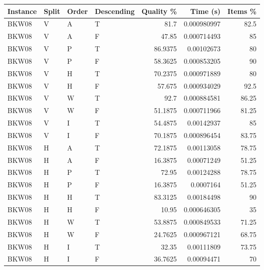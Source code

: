 \begin{tabular}{llllrrr}
    \hline
    Instance & Split & Order & Descending & Quality \% & Time (s)    & Items \% \\
    \hline
    BKW08    & V     & A     & T          & 81.7       & 0.000980997 & 82.5     \\
    BKW08    & V     & A     & F          & 47.85      & 0.000714493 & 85       \\
    BKW08    & V     & P     & T          & 86.9375    & 0.00102673  & 80       \\
    BKW08    & V     & P     & F          & 58.3625    & 0.000853205 & 90       \\
    BKW08    & V     & H     & T          & 70.2375    & 0.000971889 & 80       \\
    BKW08    & V     & H     & F          & 57.675     & 0.000934029 & 92.5     \\
    BKW08    & V     & W     & T          & 92.7       & 0.000884581 & 86.25    \\
    BKW08    & V     & W     & F          & 51.1875    & 0.000711966 & 81.25    \\
    BKW08    & V     & I     & T          & 54.4875    & 0.00142937  & 85       \\
    BKW08    & V     & I     & F          & 70.1875    & 0.000896454 & 83.75    \\
    BKW08    & H     & A     & T          & 72.1875    & 0.00113058  & 78.75    \\
    BKW08    & H     & A     & F          & 16.3875    & 0.00071249  & 51.25    \\
    BKW08    & H     & P     & T          & 72.95      & 0.00124288  & 78.75    \\
    BKW08    & H     & P     & F          & 16.3875    & 0.0007164   & 51.25    \\
    BKW08    & H     & H     & T          & 83.3125    & 0.00184498  & 90       \\
    BKW08    & H     & H     & F          & 10.95      & 0.000646305 & 35       \\
    BKW08    & H     & W     & T          & 53.8875    & 0.000849533 & 71.25    \\
    BKW08    & H     & W     & F          & 24.7625    & 0.000967121 & 68.75    \\
    BKW08    & H     & I     & T          & 32.35      & 0.00111809  & 73.75    \\
    BKW08    & H     & I     & F          & 36.7625    & 0.00094471  & 70       \\

\end{tabular}
